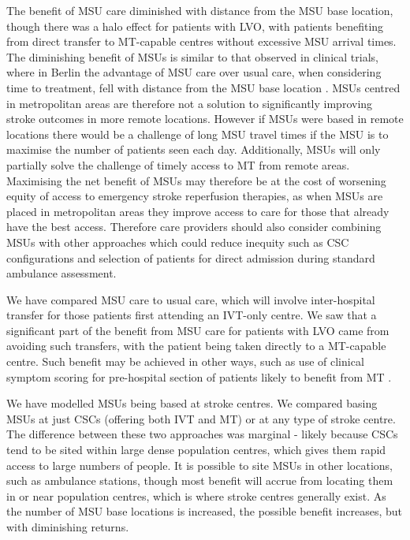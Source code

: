 The benefit of MSU care diminished with distance from the MSU base location, though there was a halo effect for patients with LVO, with patients benefiting from direct transfer to MT-capable centres without excessive MSU arrival times. The diminishing benefit of MSUs is similar to that observed in clinical trials, where in Berlin the advantage of MSU care over usual care, when considering time to treatment, fell with distance from the MSU base location \cite{koch_influence_2016}. MSUs centred in metropolitan areas are therefore not a solution to significantly improving stroke outcomes in more remote locations. However if MSUs were based in remote locations there would be a challenge of long MSU travel times if the MSU is to maximise the number of patients seen each day. Additionally, MSUs will only partially solve the challenge of timely access to MT from remote areas. Maximising the net benefit of MSUs may therefore be at the cost of worsening equity of access to emergency stroke reperfusion therapies, as when MSUs are placed in metropolitan areas they improve access to care for those that already have the best access. Therefore care providers should also consider combining MSUs with other approaches which could reduce inequity such as CSC configurations and selection of patients for direct admission during standard ambulance assessment. 

We have compared MSU care to usual care, which will involve inter-hospital transfer for those patients first attending an IVT-only centre. We saw that a significant part of the benefit from MSU care for patients with LVO came from avoiding such transfers, with the patient being taken directly to a MT-capable centre. Such benefit may be achieved in other ways, such as use of clinical symptom scoring for pre-hospital section of patients likely to benefit from MT \cite{perez_de_la_ossa_effect_2022}.

We have modelled MSUs being based at stroke centres. We compared basing MSUs at just CSCs (offering both IVT and MT) or at any type of stroke centre. The difference between these two approaches was marginal - likely because CSCs tend to be sited within large dense population centres, which gives them rapid access to large numbers of people. It is possible to site MSUs in other locations, such as ambulance stations, though most benefit will accrue from locating them in or near population centres, which is where stroke centres generally exist. As the number of MSU base locations is increased, the possible benefit increases, but with diminishing returns. 

